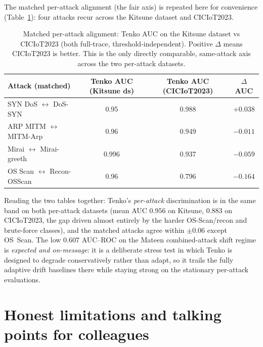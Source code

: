 \documentclass[11pt]{article}
\begin{document}
The matched per-attack alignment (the fair axis) is repeated here for convenience
(Table~\ref{tab:align}): four attacks recur across the Kitsune dataset and CICIoT2023.

\begin{table}[t]
\centering
\small
\caption{Matched per-attack alignment: Tenko AUC on the Kitsune dataset vs CICIoT2023 (both
full-trace, threshold-independent). Positive $\Delta$ means CICIoT2023 is better. This is the only
directly comparable, same-attack axis across the two per-attack datasets.}
\label{tab:align}
\begin{tabular}{lccc}
\toprule
\textbf{Attack (matched)} & \textbf{Tenko AUC (Kitsune ds)} & \textbf{Tenko AUC (CICIoT2023)} & \textbf{$\Delta$AUC} \\
\midrule
SYN DoS $\leftrightarrow$ DoS-SYN        & 0.95  & 0.988 & $+0.038$ \\
ARP MITM $\leftrightarrow$ MITM-Arp      & 0.96  & 0.949 & $-0.011$ \\
Mirai $\leftrightarrow$ Mirai-greeth     & 0.996 & 0.937 & $-0.059$ \\
OS Scan $\leftrightarrow$ Recon-OSScan   & 0.96  & 0.796 & $-0.164$ \\
\bottomrule
\end{tabular}
\end{table}

Reading the two tables together: Tenko's \emph{per-attack} discrimination is in the same band on both
per-attack datasets (mean AUC $0.956$ on Kitsune, $0.883$ on CICIoT2023, the gap driven almost
entirely by the harder OS-Scan/recon and brute-force classes), and the matched attacks agree within
$\pm 0.06$ except OS~Scan. The low $0.607$ AUC--ROC on the Mateen combined-attack shift regime is
\emph{expected and on-message}: it is a deliberate stress test in which Tenko is designed to degrade
conservatively rather than adapt, so it trails the fully adaptive drift baselines there while staying
strong on the stationary per-attack evaluations.

\section{Honest limitations and talking points for colleagues}
\label{sec:limits}
\end{document}

